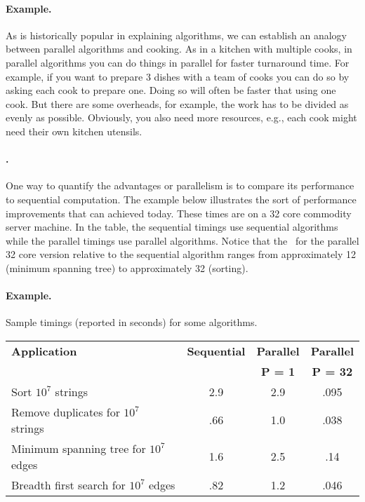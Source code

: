 \paragraph{Example.}
As is historically popular in explaining algorithms, we can establish
an analogy between parallel algorithms and cooking.  As in a kitchen
with multiple cooks, in parallel algorithms you can do things in
parallel for faster turnaround time.  For example, if you want to
prepare 3 dishes with a team of cooks you can do so by asking each
cook to prepare one.
%
Doing so will often be faster that using one cook.  But there are some
overheads, for example, the work has to be divided as evenly as
possible.  Obviously, you also need more resources, e.g., each cook
might need their own kitchen utensils.

\paragraph{.}
One way to quantify the advantages or parallelism is to compare
its performance to sequential computation.
%
The example below illustrates the sort of performance improvements
that can achieved today.  
%
%
These times are on a 32 core commodity
server machine.  In the table, the sequential timings use sequential
algorithms while the parallel timings use parallel algorithms.  Notice
that the~ for the parallel 32 core version relative to
the sequential algorithm ranges from approximately 12 (minimum
spanning tree) to approximately 32 (sorting).

\paragraph{Example.}
Sample timings (reported in seconds) for some algorithms.
  \begin{center}
  \begin{tabular}{l  c c c}
    \toprule
    \textbf{Application} & \textbf{Sequential} & \textbf{Parallel} &
    \textbf{Parallel}
\\
     & & \textbf{P = 1} & \textbf{P = 32}
\\
    \midrule
    Sort $10^7$ strings &        2.9 &  2.9 &  .095\\
    Remove duplicates for $10^7$ strings &      .66 &  1.0 & .038\\
    Minimum spanning tree for $10^7$ edges    &    1.6 & 2.5  & .14\\
    Breadth first search for $10^7$ edges  &   .82  & 1.2 &  .046\\
    \bottomrule
  \end{tabular}
  \end{center}

